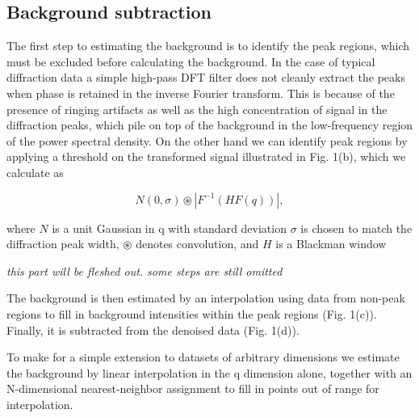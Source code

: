 \documentclass[12pt]{iopart}
\begin{document}
\subsection{Background subtraction}
The first step to estimating the background is to identify the peak
regions, which must be excluded before calculating the background. In
the case of typical diffraction data a simple high-pass DFT filter does
not cleanly extract the peaks when phase is retained in the inverse
Fourier transform. This is because of the presence of ringing artifacts
as well as the high concentration of signal in the diffraction peaks,
which pile on top of the background in the low-frequency region of the
power spectral density. On the other hand we can identify peak regions
by applying a threshold on the transformed signal illustrated in Fig.
1(b), which we calculate as

\begin{equation}
N(0, \sigma) \circledast |{F}^{-1}(H  {F}(q))|,
\end{equation}

where $N$ is a unit Gaussian in q with standard deviation $\sigma$
is chosen to match the diffraction peak width, $\circledast$ denotes
convolution, and $H$ is a Blackman window 

\emph{this part will be fleshed out. some steps are still omitted}

The background is
then estimated by an interpolation using data from non-peak regions to
fill in background intensities within the peak regions (Fig. 1(c)).
Finally, it is subtracted from the denoised data (Fig. 1(d)).

To make for a simple extension to datasets of arbitrary dimensions we
estimate the background by linear interpolation in the q dimension
alone, together with an N-dimensional nearest-neighbor assignment to
fill in points out of range for interpolation.
\end{document}
